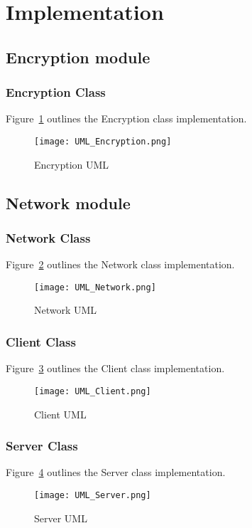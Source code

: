 \documentclass[sigconf]{acmart}
\begin{document}
\section{Implementation}

\subsection{Encryption module}
\subsubsection{Encryption Class}
Figure~\ref{Encryption UML} outlines the Encryption class implementation.
\begin{figure}[htb]
	\begin{center}
		\texttt{[image: UML\_Encryption.png]}
		\caption{Encryption UML}
		\label{Encryption UML}
	\end{center}
\end{figure}

\subsection{Network module}
\subsubsection{Network Class}
Figure~\ref{Network UML} outlines the Network class implementation.
\begin{figure}[htb]
	\begin{center}
		\texttt{[image: UML\_Network.png]}
		\caption{Network UML}
		\label{Network UML}
	\end{center}
\end{figure}
\subsubsection{Client Class}
Figure~\ref{Client UML} outlines the Client class implementation.
\begin{figure}[htb]
	\begin{center}
		\texttt{[image: UML\_Client.png]}
		\caption{Client UML}
		\label{Client UML}
	\end{center}
\end{figure}
\subsubsection{Server Class}
Figure~\ref{Server UML} outlines the Server class implementation.
\begin{figure}[htb]
	\begin{center}
		\texttt{[image: UML\_Server.png]}
		\caption{Server UML}
		\label{Server UML}
	\end{center}
\end{figure}
\end{document}
